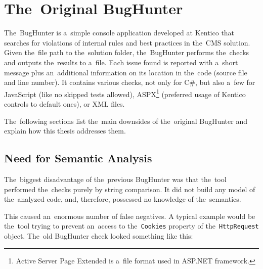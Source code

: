 \documentclass[
  digital, %
  table,   %
  lof,     %
  lot,     %
  oneside,
]{fithesis3}
\begin{document}



\section{The~Original BugHunter}
The~BugHunter is a~simple console application developed at Kentico that searches for violations of internal rules and best practices in the~CMS solution. Given the~file path to the~solution folder, the~BugHunter performs the~checks and outputs the~results to a~file. Each issue found is reported with a~short message plus an~additional information on its location in the~code (source file and line number). It contains various checks, not only for C\#, but also a~few for JavaScript (like no skipped tests allowed), ASPX\footnote{Active Server Page Extended is a~file format used in ASP.NET framework.} (preferred usage of Kentico controls to default ones), or XML files.

The~following sections list the~main downsides of the~original BugHunter and explain how this thesis addresses them.

\subsection{Need for Semantic Analysis}
The~biggest disadvantage of the~previous BugHunter was that the~tool performed the~checks purely by string comparison. It did not build any model of the~analyzed code, and, therefore, possessed no knowledge of the~semantics. 

This caused an~enormous number of false negatives. A typical example would be the~tool trying to prevent an~access to the~\texttt{Cookies} property of the~\texttt{HttpRequest} object. The~old BugHunter check looked something like this:
\end{document}
